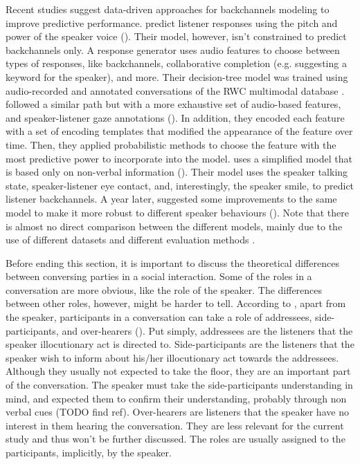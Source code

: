 \documentclass[]{simple-thesis}
\begin{document}
Recent studies suggest data-driven approaches for backchannels modeling to improve predictive performance.
\citeauthor{Nishimura2007} predict listener responses using the pitch and power of the speaker voice (\citeyear{Nishimura2007}).
Their model, however, isn't constrained to predict backchannels only.
A response generator uses audio features to choose between types of responses, like backchannels, collaborative completion (e.g. suggesting a keyword for the speaker), and more.
Their decision-tree model was trained using audio-recorded and annotated conversations of the RWC multimodal database \citep{Hayamizu1996}.
\citeauthor{Morency2008} followed a similar path but with a more exhaustive set of audio-based features, and speaker-listener gaze annotations (\citeyear{Morency2008}).
In addition, they encoded each feature with a set of encoding templates that modified the appearance of the feature over time.
Then, they applied probabilistic methods to choose the feature with the most predictive power to incorporate into the model.
\citeauthor{Huang2011} uses a simplified model that is based only on non-verbal information (\citeyear{Huang2011}).
Their model uses the speaker talking state, speaker-listener eye contact, and, interestingly, the speaker smile, to predict listener backchannels.
A year later, \citeauthor{Kok2012} suggested some improvements to the same model to make it more robust to different speaker behaviours (\citeyear{Kok2012}).
Note that there is almost no direct comparison between the different models, mainly due to the use of different datasets and different evaluation methods \citep{Morency2008}.

Before ending this section, it is important to discuss the theoretical differences between conversing parties in a social interaction.
Some of the roles in a conversation are more obvious, like the role of the speaker.
The differences between other roles, however, might be harder to tell.
According to \citeauthor{Clark1982}, apart from the speaker, participants in a conversation can take a role of addressees, side-participants, and over-hearers (\citeyear{Clark1982}).
Put simply, addressees are the listeners that the speaker illocutionary act is directed to.
Side-participants are the listeners that the speaker wish to inform about his/her illocutionary act towards the addressees.
Although they usually not expected to take the floor, they are an important part of the conversation.
The speaker must take the side-participants understanding in mind, and expected them to confirm their understanding, probably through non verbal cues (TODO find ref).
Over-hearers are listeners that the speaker have no interest in them hearing the conversation.
They are less relevant for the current study and thus won't be further discussed.
The roles are usually assigned to the participants, implicitly, by the speaker.
\end{document}
